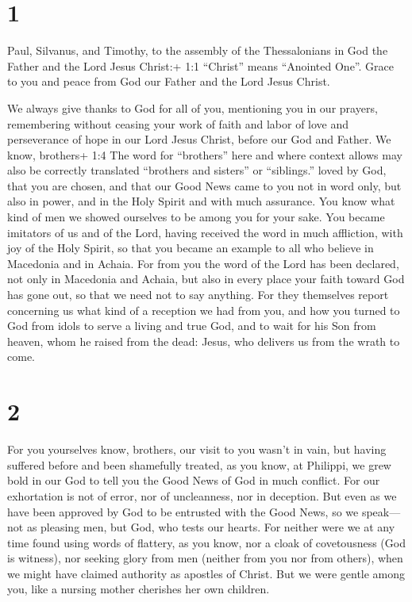 \hypertarget{section}{%
\section{1}\label{section}}

 Paul, Silvanus, and Timothy, to the assembly of the
Thessalonians in God the Father and the Lord Jesus Christ:+ 1:1
``Christ'' means ``Anointed One''. Grace to you and peace from God our
Father and the Lord Jesus Christ.

 We always give thanks to God for all of you, mentioning you
in our prayers,  remembering without ceasing your work of
faith and labor of love and perseverance of hope in our Lord Jesus
Christ, before our God and Father.  We know, brothers+ 1:4
The word for ``brothers'' here and where context allows may also be
correctly translated ``brothers and sisters'' or ``siblings.'' loved by
God, that you are chosen,  and that our Good News came to
you not in word only, but also in power, and in the Holy Spirit and with
much assurance. You know what kind of men we showed ourselves to be
among you for your sake.  You became imitators of us and of
the Lord, having received the word in much affliction, with joy of the
Holy Spirit,  so that you became an example to all who
believe in Macedonia and in Achaia.  For from you the word
of the Lord has been declared, not only in Macedonia and Achaia, but
also in every place your faith toward God has gone out, so that we need
not to say anything.  For they themselves report concerning
us what kind of a reception we had from you, and how you turned to God
from idols to serve a living and true God,  and to wait for
his Son from heaven, whom he raised from the dead: Jesus, who delivers
us from the wrath to come.

\hypertarget{section-1}{%
\section{2}\label{section-1}}

 For you yourselves know, brothers, our visit to you wasn't
in vain,  but having suffered before and been shamefully
treated, as you know, at Philippi, we grew bold in our God to tell you
the Good News of God in much conflict.  For our exhortation
is not of error, nor of uncleanness, nor in deception.  But
even as we have been approved by God to be entrusted with the Good News,
so we speak---not as pleasing men, but God, who tests our hearts.
 For neither were we at any time found using words of
flattery, as you know, nor a cloak of covetousness (God is witness),
 nor seeking glory from men (neither from you nor from
others), when we might have claimed authority as apostles of Christ.
 But we were gentle among you, like a nursing mother
cherishes her own children.

